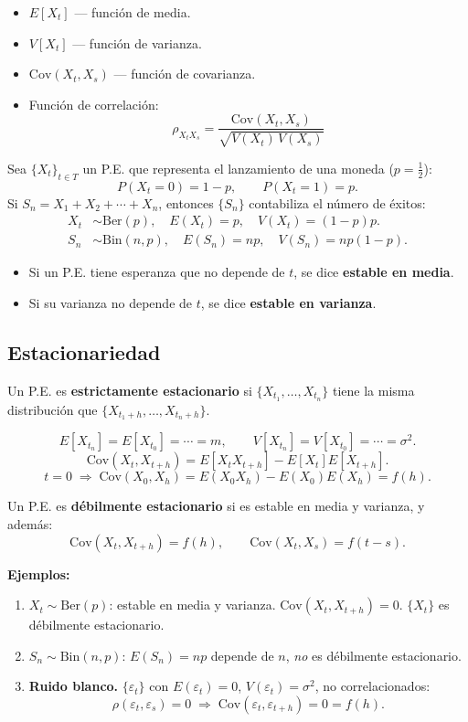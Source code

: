 \begin{itemize}
    \item $E[X_t]$ --- función de media.
    \item $V[X_t]$ --- función de varianza.
    \item $\mathrm{Cov}(X_t,X_s)$ --- función de covarianza.
    \item Función de correlación:
    \[
        \rho_{X_tX_s} = \frac{\mathrm{Cov}(X_t,X_s)}{\sqrt{V(X_t)\,V(X_s)}}
    \]
\end{itemize}

Sea $\{X_t\}_{t\in T}$ un P.E. que representa el lanzamiento de una moneda ($p=\tfrac{1}{2}$):
\[
    P(X_t=0)=1-p,\qquad P(X_t=1)=p.
\]
Si $S_n = X_1+X_2+\cdots+X_n$, entonces $\{S_n\}$ contabiliza el número de éxitos:
\begin{align*}
    X_t &\sim \mathrm{Ber}(p),\quad E(X_t)=p,\quad V(X_t)=(1-p)p.\\
    S_n &\sim \mathrm{Bin}(n,p),\quad E(S_n)=np,\quad V(S_n)=np(1-p).
\end{align*}

\begin{nota}
\begin{itemize}
    \item[$\alpha$)] Si un P.E. tiene esperanza que no depende de $t$, se dice \textbf{estable en media}.
    \item[$\beta$)] Si su varianza no depende de $t$, se dice \textbf{estable en varianza}.
\end{itemize}
\end{nota}

\subsection{Estacionariedad}

Un P.E. es \textbf{estrictamente estacionario} si $\{X_{t_1},\dots,X_{t_n}\}$ tiene la misma distribución que $\{X_{t_1+h},\dots,X_{t_n+h}\}$.

\[
E[X_{t_n}]=E[X_{t_0}]=\cdots=m,\qquad V[X_{t_n}]=V[X_{t_0}]=\cdots=\sigma^2.
\]
\[
\mathrm{Cov}(X_t,X_{t+h})=E[X_tX_{t+h}]-E[X_t]E[X_{t+h}].
\]
\[
t=0\;\Rightarrow\;\mathrm{Cov}(X_0,X_h)=E(X_0X_h)-E(X_0)E(X_h)=f(h).
\]

Un P.E. es \textbf{débilmente estacionario} si es estable en media y varianza, y además:
\[
\mathrm{Cov}(X_t,X_{t+h})=f(h),\qquad \mathrm{Cov}(X_t,X_s)=f(t-s).
\]

\textbf{Ejemplos:}
\begin{enumerate}[label=\alph*)]
    \item $X_t\sim\mathrm{Ber}(p)$: estable en media y varianza. $\mathrm{Cov}(X_t,X_{t+h})=0$. $\{X_t\}$ es débilmente estacionario.
    \item $S_n\sim\mathrm{Bin}(n,p)$: $E(S_n)=np$ depende de $n$, \emph{no} es débilmente estacionario.
    \item \textbf{Ruido blanco.} $\{\varepsilon_t\}$ con $E(\varepsilon_t)=0$, $V(\varepsilon_t)=\sigma^2$, no correlacionados:
    \[
        \rho(\varepsilon_t,\varepsilon_s)=0\;\Rightarrow\;\mathrm{Cov}(\varepsilon_t,\varepsilon_{t+h})=0=f(h).
    \]
\end{enumerate}

